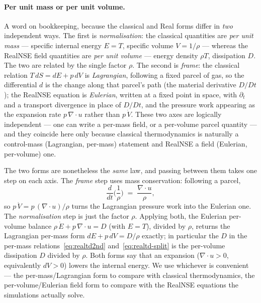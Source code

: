 \paragraph{Per unit mass or per unit volume.}
A word on bookkeeping, because the classical and Real forms differ in \emph{two}
independent ways. The first is \emph{normalisation}: the classical quantities are
\emph{per unit mass} --- specific internal energy $E = T$, specific volume
$V = 1/\rho$ --- whereas the RealNSE field quantities are \emph{per unit volume}
--- energy density $\rho T$, dissipation $D$. The two are related by the single
factor $\rho$. The second is \emph{frame}: the classical relation
$T\,dS = dE + p\,dV$ is \emph{Lagrangian}, following a fixed parcel of gas, so the
differential $d$ is the change along that parcel's path (the material derivative
$D/Dt$); the RealNSE equation is \emph{Eulerian}, written at a fixed point in
space, with $\partial_t$ and a transport divergence in place of $D/Dt$, and the
pressure work appearing as the expansion rate $p\,\nabla\!\cdot u$ rather than
$p\,\dot V$. These two axes are logically independent --- one can write a
per-mass field, or a per-volume parcel quantity --- and they coincide here only
because classical thermodynamics is naturally a control-mass (Lagrangian,
per-mass) statement and RealNSE a field (Eulerian, per-volume) one.

The two forms are nonetheless the \emph{same} law, and passing between them takes
one step on each axis. The \emph{frame} step uses mass conservation: following a
parcel,
\[
\frac{d}{dt}\Big(\frac{1}{\rho}\Big) \;=\; \frac{\nabla\!\cdot u}{\rho},
\]
so $p\,\dot V = p\,(\nabla\!\cdot u)/\rho$ turns the Lagrangian pressure work into
the Eulerian one. The \emph{normalisation} step is just the factor $\rho$.
Applying both, the Eulerian per-volume balance
$\rho\,\dot E + p\,\nabla\!\cdot u = D$ (with $E=T$), divided by $\rho$, returns
the Lagrangian per-mass form $dE + p\,dV = D/\rho$ exactly; in particular the $D$
in the per-mass relations~\eqref{eq:realtd2nd} and~\eqref{eq:realtd-split} is the
per-volume dissipation $D$ divided by $\rho$. Both forms say that an expansion
($\nabla\!\cdot u > 0$, equivalently $dV>0$) lowers the internal energy. We use
whichever is convenient --- the per-mass/Lagrangian form to compare with
classical thermodynamics, the per-volume/Eulerian field form to compare with the
RealNSE equations the simulations actually solve.

